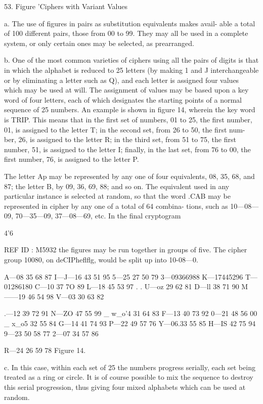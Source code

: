 53. Figure 'Ciphers with Variant Values

a. The use of ﬁgures in pairs as substitution equivalents makes avail-
able a total of 100 different pairs, those from 00 to 99. They may all
be used in a complete system, or only certain ones may be selected, as
prearranged.

b. One of the most common varieties of ciphers using all the pairs of
digits is that in which the alphabet is reduced to 25 letters (by making
1 and J interchangeable or by eliminating a letter such as Q), and each
letter is assigned four values which may be used at will. The assignment
of values may be based upon a key word of four letters, each of which
designates the starting points of a normal sequence of 25 numbers. An
example is shown in ﬁgure 14, wherein the key word is TRIP. This
means that in the ﬁrst set of numbers, 01 to 25, the ﬁrst number, 01, is
assigned to the letter T; in the second set, from 26 to 50, the ﬁrst num-
ber, 26, is assigned to the letter R; in the third set, from 51 to 75, the
ﬁrst number, 51, is assigned to the letter I; ﬁnally, in the last set, from
76 to 00, the ﬁrst number, 76, is assigned to the letter P.

The letter Ap may be represented by any one of four equivalents, 08,
35, 68, and 87; the letter B, by 09, 36, 69, 88; and so on. The equivalent
used in any particular instance is selected at random, so that the word
.CAB may be represented in cipher by any one of a total of 64 combina-
tions, such as 10—08—09, 70—35—09, 37—08—69, etc. In the ﬁnal cryptogram

4'6

REF ID : M5932
the ﬁgures may be run together in groups of ﬁve. The cipher group
10080, on deCIPheﬂﬂg, would be split up into 10-08—0.

A—08 35 68 87 I—J—16 43 51 95 5—25 27 50 79
3—09366988 K—17445296 T—01286180
C—10 37 7O 89 L—18 45 53 97 . . U—oz 29 62 81
D—ll 38 71 90 M——19 46 54 98 V—03 30 63 82

.—12 39 72 91 N—ZO 47 55 99 _ w_o'4 31 64 83
F—13 40 73 92 0—21 48 56 00 _ x_o5 32 55 84
G—14 41 74 93 P—22 49 57 76 Y—06.33 55 85
H—IS 42 75 94 9—23 50 58 77 2—07 34 57 86

R—24 26 59 78
Figure 14.

c. In this case, within each set of 25 the numbers progress serially,
each set being treated as a ring or circle. It is of course possible to mix
the sequence to destroy this serial progression, thus giving four mixed
alphabets which can be used at random.

